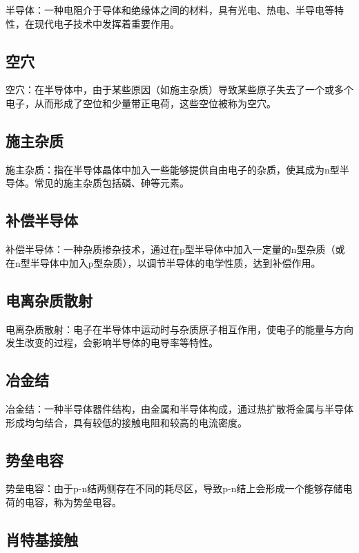 \documentclass[UTF8]{ctexart}   %
\begin{document}
半导体：一种电阻介于导体和绝缘体之间的材料，具有光电、热电、半导电等特性，在现代电子技术中发挥着重要作用。

\subsection{空穴}

空穴：在半导体中，由于某些原因（如施主杂质）导致某些原子失去了一个或多个电子，从而形成了空位和少量带正电荷，这些空位被称为空穴。

\subsection{施主杂质}

施主杂质：指在半导体晶体中加入一些能够提供自由电子的杂质，使其成为n型半导体。常见的施主杂质包括磷、砷等元素。

\subsection{补偿半导体}

补偿半导体：一种杂质掺杂技术，通过在p型半导体中加入一定量的n型杂质（或在n型半导体中加入p型杂质），以调节半导体的电学性质，达到补偿作用。

\subsection{电离杂质散射}

电离杂质散射：电子在半导体中运动时与杂质原子相互作用，使电子的能量与方向发生改变的过程，会影响半导体的电导率等特性。

\subsection{冶金结}

冶金结：一种半导体器件结构，由金属和半导体构成，通过热扩散将金属与半导体形成均匀结合，具有较低的接触电阻和较高的电流密度。

\subsection{势垒电容}

势垒电容：由于p-n结两侧存在不同的耗尽区，导致p-n结上会形成一个能够存储电荷的电容，称为势垒电容。

\subsection{肖特基接触}
\end{document}
